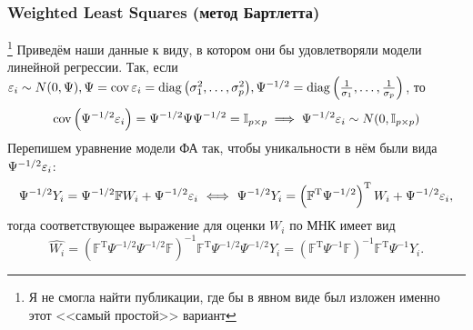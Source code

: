   \subsubsection{Weighted Least Squares (метод Бартлетта)}\footnote{Я не смогла найти публикации, где бы в явном виде был изложен именно этот <<самый простой>> вариант}
    Приведём наши данные к виду, в котором они бы удовлетворяли модели линейной регрессии. Так, если $\varepsilon_i\sim N(0, \Psi), \Psi = \operatorname{cov}{\varepsilon_i} = \operatorname{diag}{\left(\sigma_1^2, \ldots, \sigma_p^2\right)}, \Psi^{-1/2} = \operatorname{diag}{\left(\frac{1}{\sigma_1}, \ldots, \frac{1}{\sigma_p}\right)}$, то 
    $$\operatorname{cov}{\left(\Psi^{-1/2}\varepsilon_i\right)} = \Psi^{-1/2}\Psi\Psi^{-1/2} = \mathbb{I}_{p\times p} \implies \Psi^{-1/2}\varepsilon_i \sim N(0, \mathbb{I}_{p\times p})$$
    Перепишем уравнение модели ФА так, чтобы уникальности в нём были вида $\Psi^{-1/2}\varepsilon_i$:
    \begin{equation}
    \Psi^{-1/2} Y_i = \Psi^{-1/2} \mathbb F W_i + \Psi^{-1/2}\varepsilon_i \ \Longleftrightarrow \  \Psi^{-1/2} Y_i = \left(\mathbb F^\mathrm T \Psi^{-1/2}\right)^\mathrm T W_i + \Psi^{-1/2}\varepsilon_i,
    \end{equation}
    тогда соответствующее выражение для оценки $W_i$ по МНК имеет вид
    $$\hat{W_i} = \left(\mathbb F^\mathrm T \Psi^{-1/2} \Psi^{-1/2} \mathbb F\right)^{-1}\mathbb F^\mathrm T \Psi^{-1/2}\Psi^{-1/2} Y_i = \left(\mathbb F^\mathrm T \Psi^{-1} \mathbb F\right)^{-1} \mathbb F^\mathrm T \Psi^{-1} Y_i.$$

